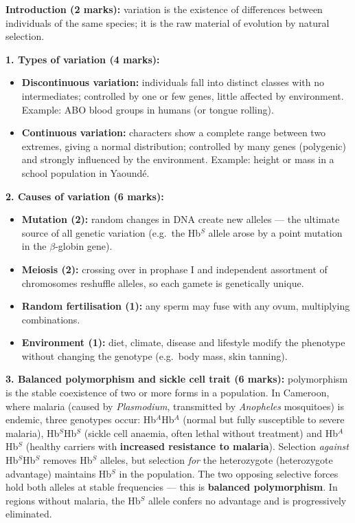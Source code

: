 \documentclass[11pt]{article}
\newcommand{\cle}[1]{{\popxbold\color{popdark}#1}}
\begin{document}
\begin{corrige}
\textbf{Introduction (2 marks):} variation is the existence of differences between individuals of the same species; it is the raw material of evolution by natural selection.

\textbf{1. Types of variation (4 marks):}
\begin{itemize}
\item \textbf{Discontinuous variation:} individuals fall into distinct classes with no intermediates; controlled by one or few genes, little affected by environment. Example: ABO blood groups in humans (or tongue rolling).
\item \textbf{Continuous variation:} characters show a complete range between two extremes, giving a normal distribution; controlled by many genes (polygenic) and strongly influenced by the environment. Example: height or mass in a school population in Yaoundé.
\end{itemize}

\textbf{2. Causes of variation (6 marks):}
\begin{itemize}
\item \textbf{Mutation (2):} random changes in DNA create new alleles — the ultimate source of all genetic variation (e.g.\ the Hb$^S$ allele arose by a point mutation in the $\beta$-globin gene).
\item \textbf{Meiosis (2):} crossing over in prophase I and independent assortment of chromosomes reshuffle alleles, so each gamete is genetically unique.
\item \textbf{Random fertilisation (1):} any sperm may fuse with any ovum, multiplying combinations.
\item \textbf{Environment (1):} diet, climate, disease and lifestyle modify the phenotype without changing the genotype (e.g.\ body mass, skin tanning).
\end{itemize}

\textbf{3. Balanced polymorphism and sickle cell trait (6 marks):} \cle{polymorphism} is the stable coexistence of two or more forms in a population. In Cameroon, where malaria (caused by \emph{Plasmodium}, transmitted by \emph{Anopheles} mosquitoes) is endemic, three genotypes occur: Hb$^A$Hb$^A$ (normal but fully susceptible to severe malaria), Hb$^S$Hb$^S$ (sickle cell anaemia, often lethal without treatment) and Hb$^A$Hb$^S$ (healthy carriers with \textbf{increased resistance to malaria}). Selection \emph{against} Hb$^S$Hb$^S$ removes Hb$^S$ alleles, but selection \emph{for} the heterozygote (\cle{heterozygote advantage}) maintains Hb$^S$ in the population. The two opposing selective forces hold both alleles at stable frequencies — this is \textbf{balanced polymorphism}. In regions without malaria, the Hb$^S$ allele confers no advantage and is progressively eliminated.


\end{corrige}
\end{document}
